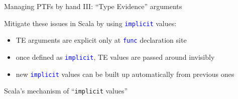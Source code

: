 \documentclass[english]{beamer}
\begin{document}
\begin{frame}{Managing PTFs by hand III: ``Type Evidence'' arguments}
\begin{itemize}
\end{itemize}
Mitigate these issues in Scala by using \texttt{\textcolor{blue}{\footnotesize{}implicit}}
values:
\begin{itemize}
\item TE arguments are explicit only at \texttt{\textcolor{blue}{\footnotesize{}func}}
declaration site
\item once defined as \texttt{\textcolor{blue}{\footnotesize{}implicit}},
TE values are passed around invisibly
\item new \texttt{\textcolor{blue}{\footnotesize{}implicit}} values can
be built up automatically from previous ones
\end{itemize}
\end{frame}

\begin{frame}{Scala's mechanism of ``\texttt{implicit} values''}


\end{frame}
\end{document}
